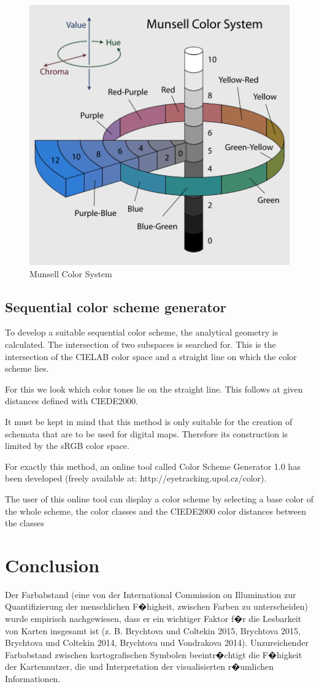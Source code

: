 \begin{figure}
	\centering
	\includegraphics[width=0.6\linewidth]{source/images/munsell}
	\caption{Munsell Color System}
	\label{fig:munsell}
\end{figure}

\subsection{Sequential color scheme generator}
To develop a suitable sequential color scheme, the analytical geometry is calculated. The intersection of two subspaces is searched for. This is the intersection of the CIELAB color space and a straight line on which the color scheme lies.

For this we look which color tones lie on the straight line. This follows at given distances defined with CIEDE2000. 

It must be kept in mind that this method is only suitable for the creation of schemata that are to be used for digital maps. Therefore its construction is limited by the sRGB color space. 

For exactly this method, an online tool called Color Scheme Generator 1.0 has been developed (freely available at: http://eyetracking.upol.cz/color).

The user of this online tool can display a color scheme by selecting a base color of the whole scheme, the color classes and the CIEDE2000 color distances between the classes \parencite{brychtovaDole2015}

\section{Conclusion}

Der Farbabstand (eine von der International Commission on
Illumination zur Quantifizierung der menschlichen F�higkeit, zwischen Farben zu unterscheiden) wurde empirisch nachgewiesen, dass er ein wichtiger Faktor f�r die Lesbarkeit von Karten insgesamt ist (z. B. Brychtova und Coltekin 2015, Brychtova 2015, Brychtova und Coltekin 2014, Brychtova und Vondrakova 2014). Unzureichender Farbabstand zwischen kartografischen Symbolen beeintr�chtigt die F�higkeit der Kartennutzer, die und Interpretation der visualisierten r�umlichen Informationen.

\parencite{brychtovaDole2015}



%